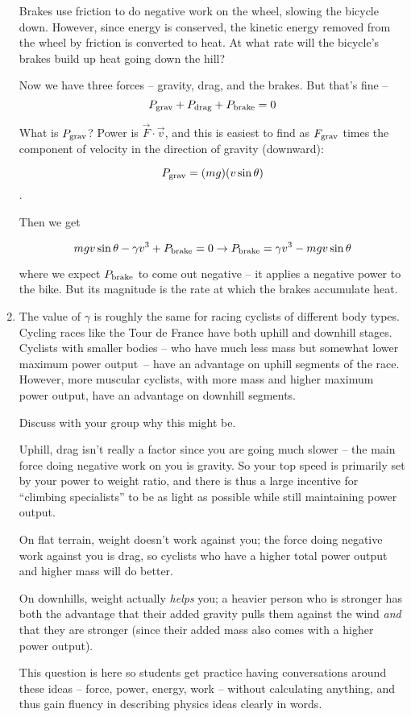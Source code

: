 \documentclass[12pt]{article}
\begin{document}
\begin{enumerate}
Brakes use friction to do negative work on the wheel, slowing the bicycle down. However, since energy is conserved, the kinetic energy removed from the wheel by friction is converted to heat. At what rate will the bicycle's brakes build up heat going down the hill?

{\color{red}
Now we have three forces -- gravity, drag, and the brakes. But that's fine --
$$
P_{\rm{grav}} + P_{\rm {drag}} + P_{\rm {brake}} = 0
$$

What is $P_{\rm{grav}}$? Power is $\vec F \cdot \vec v$, and this is easiest to find as $F_{\rm grav}$ times the component of velocity in the direction of gravity (downward):

$$P_{\rm{grav}} = (mg) (v \sin \theta)$$.

Then we get

$$
mgv \sin \theta - \gamma v^3 + P_{\rm {brake}} = 0 \rightarrow P_{\rm {brake}} =  \gamma v^3 - mgv \sin \theta
$$

where we expect $P_{\rm brake}$ to come out negative -- it applies a negative power to the bike. But its magnitude is the rate at which the brakes accumulate heat.

}
\item The value of $\gamma$ is roughly the same for racing cyclists of different body types. Cycling races like the Tour de France have both uphill and downhill stages. Cyclists with smaller bodies -- who have much less mass but somewhat lower maximum power output~-- have an advantage on uphill segments of the race. However, more muscular cyclists, with more mass and higher maximum power output, have an advantage on downhill segments. 

Discuss with your group why this might be.

{\color{red} Uphill, drag isn't really a factor since you are going much slower -- the main force doing negative work on you is gravity. So your top speed is primarily set by your power to weight ratio, and there is thus a large incentive for ``climbing specialists'' to be as light as possible while still maintaining power output.
	
	On flat terrain, weight doesn't work against you; the force doing negative work against you is drag, so cyclists who have a higher total power output and higher mass will do better.
	
	On downhills, weight actually {\it helps} you; a heavier person who is stronger has both the advantage that their added gravity pulls them against the wind {\it and} that they are stronger (since their added mass also comes with a higher power output).
	
	This question is here so students get practice having conversations around these ideas -- force, power, energy, work -- without calculating anything, and thus gain fluency in describing physics ideas clearly in words.
}

\end{enumerate}
\end{document}
